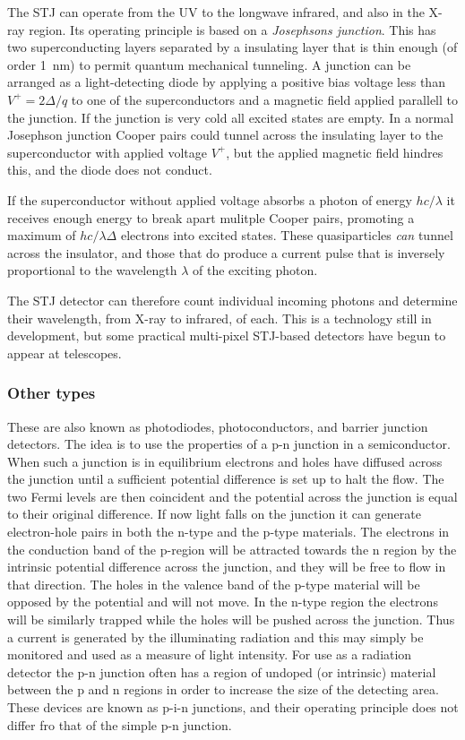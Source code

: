 The STJ can operate 
from the UV to the longwave infrared, and also in the X-ray region.
Its operating principle is based on a {\it Josephsons junction}. This has two 
superconducting layers separated by a insulating layer that is thin
enough (of order 1~nm) to permit quantum mechanical tunneling. A
junction can be arranged as a light-detecting diode by applying a
positive bias voltage less than $V^{+}=2\Delta/q$ to one of the
superconductors and a magnetic field applied parallell to the
junction. If the junction is very cold all excited states are
empty. In a normal Josephson junction Cooper pairs could tunnel across
the insulating layer to the superconductor with applied voltage
$V^{+}$, but the applied magnetic field hindres this, and the diode
does not conduct.

If the superconductor without applied voltage absorbs a photon of
energy $hc/\lambda$ it receives enough energy to break apart mulitple
Cooper pairs, promoting a maximum of $hc/\lambda\Delta$ electrons into
excited states. These quasiparticles {\it can} tunnel across the
insulator, and those that do produce a current pulse that is inversely
proportional to the wavelength $\lambda$ of the exciting photon.

The STJ detector can therefore count individual incoming photons and
determine their wavelength, from X-ray to infrared, of each. This is a
technology still in development, but some practical multi-pixel
STJ-based detectors have begun to appear at telescopes.

\subsubsection{Other types}

 These are also known as photodiodes,
photoconductors, and barrier junction detectors. The idea is to use the
properties of a p-n junction in a semiconductor. When such a junction
is in equilibrium electrons and holes have diffused across the
junction until a sufficient potential difference is set up to halt the
flow. The two Fermi levels are then coincident and the potential
across the junction is equal to their original difference. If now
light falls on the junction it can generate electron-hole pairs in
both the n-type and the p-type materials. The electrons in the
conduction band of the p-region will be attracted towards the n region
by the intrinsic potential difference across the junction, and they
will be free to flow in that direction. The holes in the valence band
of the p-type material will be opposed by the potential and will not
move. In the n-type region the electrons will be similarly trapped
while the holes will be pushed across the junction. Thus a current is
generated by the illuminating radiation and this may simply be
monitored and used as a measure of light intensity. For use as a
radiation detector the p-n junction often has a region of undoped (or
intrinsic) material between the p and n regions in order to increase
the size of the detecting area. These devices are known as p-i-n
junctions, and their operating principle does not differ fro that of
the simple p-n junction.

